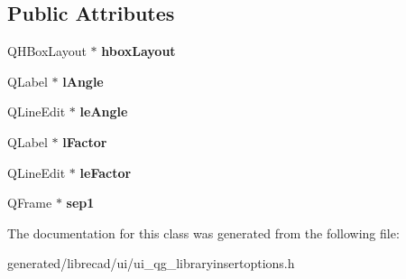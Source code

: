 \subsection*{Public Attributes}
\begin{DoxyCompactItemize}
\item 
\hypertarget{classUi__QG__LibraryInsertOptions_a433d7919a9b3f9cf5a8e30699a5d1851}{Q\-H\-Box\-Layout $\ast$ {\bfseries hbox\-Layout}}\label{classUi__QG__LibraryInsertOptions_a433d7919a9b3f9cf5a8e30699a5d1851}

\item 
\hypertarget{classUi__QG__LibraryInsertOptions_ab6b7c98be0cc833e24404d83af6098af}{Q\-Label $\ast$ {\bfseries l\-Angle}}\label{classUi__QG__LibraryInsertOptions_ab6b7c98be0cc833e24404d83af6098af}

\item 
\hypertarget{classUi__QG__LibraryInsertOptions_a4a6342ec6bb7d024647a9ca4ca650d03}{Q\-Line\-Edit $\ast$ {\bfseries le\-Angle}}\label{classUi__QG__LibraryInsertOptions_a4a6342ec6bb7d024647a9ca4ca650d03}

\item 
\hypertarget{classUi__QG__LibraryInsertOptions_a62aedc7f089549cd5df891a127a5de9a}{Q\-Label $\ast$ {\bfseries l\-Factor}}\label{classUi__QG__LibraryInsertOptions_a62aedc7f089549cd5df891a127a5de9a}

\item 
\hypertarget{classUi__QG__LibraryInsertOptions_af9602799da2960fdf26a8be732415624}{Q\-Line\-Edit $\ast$ {\bfseries le\-Factor}}\label{classUi__QG__LibraryInsertOptions_af9602799da2960fdf26a8be732415624}

\item 
\hypertarget{classUi__QG__LibraryInsertOptions_a64041be7bb7f59ef2399e3f24ec5eddd}{Q\-Frame $\ast$ {\bfseries sep1}}\label{classUi__QG__LibraryInsertOptions_a64041be7bb7f59ef2399e3f24ec5eddd}

\end{DoxyCompactItemize}


The documentation for this class was generated from the following file\-:\begin{DoxyCompactItemize}
\item 
generated/librecad/ui/ui\-\_\-qg\-\_\-libraryinsertoptions.\-h\end{DoxyCompactItemize}

